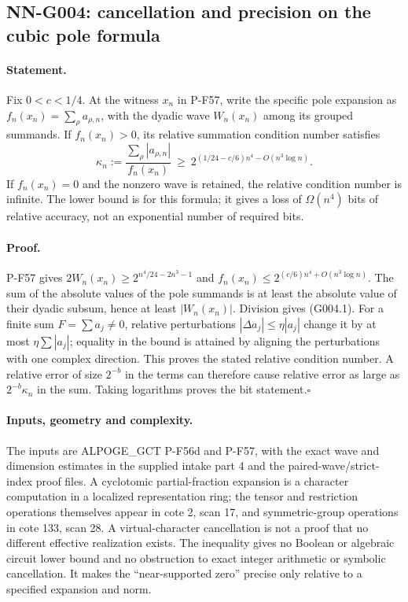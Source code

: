 \subsection{NN-G004: cancellation and precision on the cubic pole formula}
\paragraph{Statement.}
Fix $0<c<1/4$. At the witness $x_n$ in P-F57, write the specific
pole expansion as $f_n(x_n)=\sum_\rho a_{\rho,n}$, with the dyadic
wave $W_n(x_n)$ among its grouped summands. If $f_n(x_n)>0$, its
relative summation condition number satisfies
\[
 \kappa_n:=\frac{\sum_\rho|a_{\rho,n}|}{f_n(x_n)}
 \ \ge\ 2^{(1/24-c/6)n^4-O(n^3\log n)}.
 \tag{G004.1}
\]
If $f_n(x_n)=0$ and the nonzero wave is retained, the relative
condition number is infinite. The lower bound is for this formula;
it gives a loss of $\Omega(n^4)$ bits of relative accuracy, not an
exponential number of required bits.

\paragraph{Proof.}
P-F57 gives
$2W_n(x_n)\ge2^{n^4/24-2n^3-1}$ and
$f_n(x_n)\le2^{(c/6)n^4+O(n^3\log n)}$.
The sum of the absolute values of the pole summands is at least
the absolute value of their dyadic subsum, hence at least
$|W_n(x_n)|$. Division gives (G004.1).
For a finite sum $F=\sum a_j\ne0$, relative perturbations
$|\Delta a_j|\le\eta|a_j|$ change it by at most
$\eta\sum|a_j|$; equality in the bound is attained by aligning
the perturbations with one complex direction. This proves the
stated relative condition number. A relative error of size
$2^{-b}$ in the terms can therefore cause relative error as large
as $2^{-b}\kappa_n$ in the sum. Taking logarithms proves the bit
statement.\hfill$\square$

\paragraph{Inputs, geometry and complexity.}
The inputs are ALPOGE\_GCT P-F56d and P-F57, with the exact wave
and dimension estimates in the supplied intake part 4 and the
paired-wave/strict-index proof files. A cyclotomic partial-fraction
expansion is a character computation in a localized representation
ring; the tensor and restriction operations themselves appear in
cote 2, scan 17, and symmetric-group operations in cote 133,
scan 28. A virtual-character cancellation is not a proof that
no different effective realization exists. The inequality gives
no Boolean or algebraic circuit lower bound and no obstruction
to exact integer arithmetic or symbolic cancellation. It makes
the ``near-supported zero'' precise only relative to a specified
expansion and norm.

